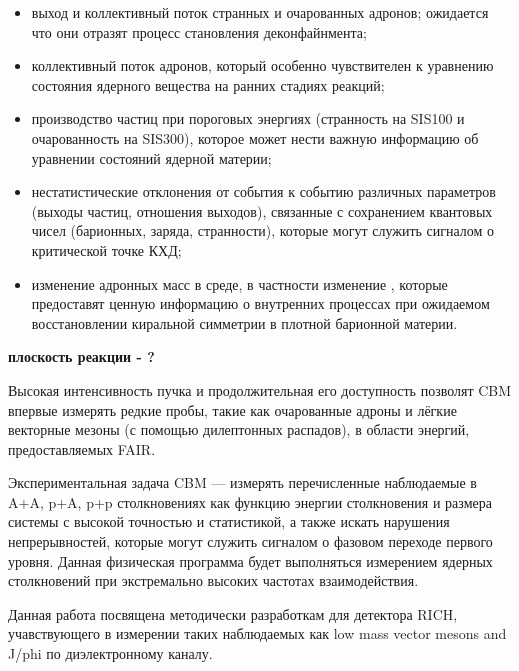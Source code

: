 \begin{itemize}
\item выход и коллективный поток странных и очарованных адронов; ожидается что они отразят процесс становления деконфайнмента;
\item коллективный поток адронов, который особенно чувствителен к уравнению состояния ядерного вещества на ранних стадиях реакций;
\item производство частиц при пороговых энергиях (странность на SIS100 и очарованность на SIS300), которое может нести важную информацию об уравнении состояний ядерной материи;
\item нестатистические отклонения от события к событию различных параметров (выходы частиц, отношения выходов), связанные с сохранением квантовых чисел (барионных, заряда, странности), которые могут служить сигналом о критической точке КХД;
\item изменение адронных масс в среде, в частности изменение \todo, которые предоставят ценную информацию о внутренних процессах при ожидаемом восстановлении киральной симметрии в плотной барионной материи.
\end{itemize}

\todo \textbf{плоскость реакции - ?}

Высокая интенсивность пучка и продолжительная его доступность позволят CBM впервые измерять редкие пробы, такие как очарованные адроны и лёгкие векторные мезоны (с помощью дилептонных распадов), в области энергий, предоставляемых FAIR.

Экспериментальная задача CBM --- измерять перечисленные наблюдаемые в A+A, p+A, p+p столкновениях как функцию энергии столкновения и размера системы с высокой точностью и статистикой, а также искать нарушения непрерывностей, которые могут служить сигналом о фазовом переходе первого уровня. Данная физическая программа будет выполняться измерением ядерных столкновений при экстремально высоких частотах взаимодействия.

Данная работа посвящена методически разработкам для детектора RICH, учавствующего в измерении таких наблюдаемых как low mass vector mesons and J/phi по диэлектронному каналу.









